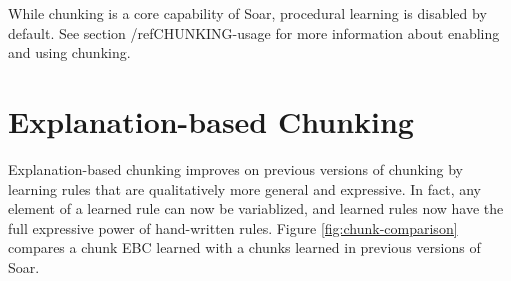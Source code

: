 While chunking is a core capability of Soar, procedural learning is disabled by default.  See section /ref{CHUNKING-usage} for more information about enabling and using chunking.

\section{Explanation-based Chunking}

Explanation-based chunking improves on previous versions of chunking by learning rules that are qualitatively more general and expressive.  In fact, any element of a learned rule can now be variablized, and learned rules now have the full expressive power of hand-written rules. Figure \ref{fig:chunk-comparison} compares a chunk EBC learned with a chunks learned in previous versions of Soar.

